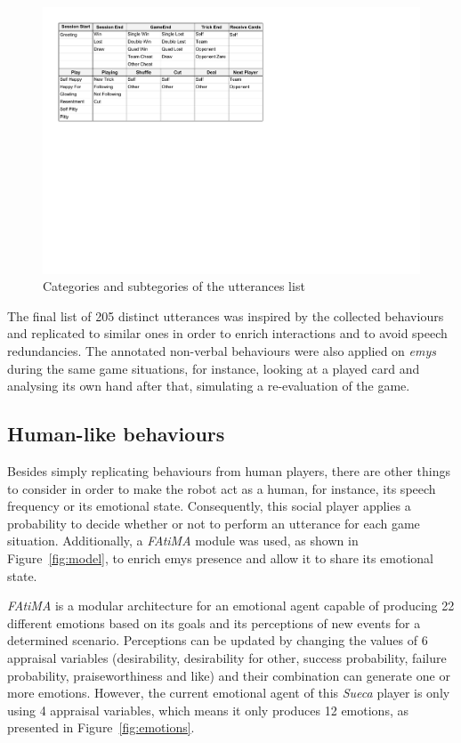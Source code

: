 \begin{figure}[ht]
	\centering
    \includegraphics[width=1\textwidth]{./img/utterances}
	\caption{Categories and subtegories of the utterances list}
\label{fig:utterances}
\end{figure}

The final list of 205 distinct utterances was inspired by the collected behaviours and replicated to similar ones in order to enrich interactions and to avoid speech redundancies.
The annotated non-verbal behaviours were also applied on \emph{emys} during the same game situations, for instance, looking at a played card and analysing its own hand after that, simulating a re-evaluation of the game.

\subsection{Human-like behaviours}

Besides simply replicating behaviours from human players, there are other things to consider in order to make the robot act as a human, for instance, its speech frequency or its emotional state.
Consequently, this social player applies a probability to decide whether or not to perform an utterance for each game situation.
Additionally, a \emph{FAtiMA} module was used, as shown in Figure~\ref{fig:model}, to enrich \ac{emys} presence and allow it to share its emotional state.

\emph{FAtiMA} is a modular architecture for an emotional agent capable of producing 22 different emotions based on its goals and its perceptions of new events for a determined scenario.
Perceptions can be updated by changing the values of 6 appraisal variables (desirability, desirability for other, success probability, failure probability, praiseworthiness and like) and their combination can generate one or more emotions.
However, the current emotional agent of this \emph{Sueca} player is only using 4 appraisal variables, which means it only produces 12 emotions, as presented in Figure~\ref{fig:emotions}.

